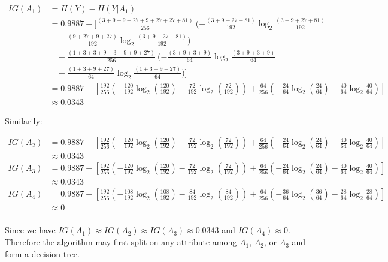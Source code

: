 \documentclass[12pt]{article}
\begin{document}
\begin{align*}
    IG(A_1) &= H(Y) - H(Y | A_1) \\
    &= 0.9887 - [ \frac{(3 + 9 + 9 + 27 + 9 + 27 + 27 + 81)}{256}  \ (- \frac{(3 + 9  + 27 + 81)}{192} \log_2 \frac{(3 + 9  + 27 + 81)}{192} \\ &\ \ \ \ - \frac{(9 + 27  + 9 + 27)}{192} \log_2 \frac{(3 + 9  + 27 + 81)}{192}) \  \ \\ &\ \ \ \ +
    \frac{(1 + 3 + 3 + 9 + 3 + 9 + 9 + 27)}{256}  \ (- \frac{(3 + 9  + 3 + 9)}{64} \log_2 \frac{(3 + 9  + 3 + 9)}{64} \\ &\ \ \ \ - \frac{(1 + 3  + 9 + 27)}{64} \log_2 \frac{(1 + 3  + 9 + 27)}{64})] \\
    &= 0.9887 - [\frac{192}{256} (-\frac{120}{192} \log_2(\frac{120}{192}) -\frac{72}{192} \log_2(\frac{72}{192}))  + \frac{64}{256} (-\frac{24}{64} \log_2 (\frac{24}{64}) - \frac{40}{64} \log_2 \frac{40}{64} )] \\
    &\approx 0.0343
\end{align*}

\noindent Similarily:

\begin{align*}
    IG(A_2) &= 0.9887 - [\frac{192}{256} (-\frac{120}{192} \log_2(\frac{120}{192}) -\frac{72}{192} \log_2(\frac{72}{192}))  + \frac{64}{256} (-\frac{24}{64} \log_2 (\frac{24}{64}) - \frac{40}{64} \log_2 \frac{40}{64} )] \\
    &\approx 0.0343 \\
    IG(A_3) &= 0.9887 - [\frac{192}{256} (-\frac{120}{192} \log_2(\frac{120}{192}) -\frac{72}{192} \log_2(\frac{72}{192}))  + \frac{64}{256} (-\frac{24}{64} \log_2 (\frac{24}{64}) - \frac{40}{64} \log_2 \frac{40}{64} )] \\
    &\approx 0.0343 \\
    IG(A_4) &= 0.9887 - [\frac{192}{256} (-\frac{108}{192} \log_2(\frac{108}{192}) -\frac{84}{192} \log_2(\frac{84}{192}))  + \frac{64}{256} (-\frac{36}{64} \log_2 (\frac{36}{64}) - \frac{28}{64} \log_2 \frac{28}{64} )] \\
    &\approx 0 \\
\end{align*}

Since we have $IG(A_1) \approx IG(A_2) \approx IG(A_3) \approx 0.0343$ and $IG(A_4) \approx 0$. Therefore the algorithm may first split on any attribute among $A_1$, $A_2$, or $A_3$ and form a decision tree.



\end{document}
